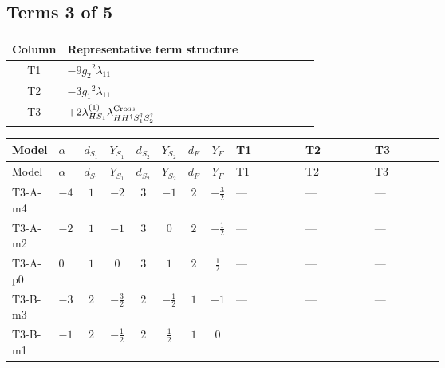 \documentclass[8pt]{article}
\begin{document}
\begin{landscape}
\subsection*{Terms 3 of 5}
\begin{center}
\begin{tabular}{@{}c >{\raggedright\arraybackslash}p{0.82\linewidth}@{}}
\toprule
Column & Representative term structure \\
\midrule
T1 & \(\displaystyle -9 {g_2}^2 {\lambda_{11}}\) \\
\midrule
T2 & \(\displaystyle -3 {g_1}^2 {\lambda_{11}}\) \\
\midrule
T3 & \(\displaystyle +2 {\lambda_{HS_1}^{(1)}} {\lambda_{H H^\dagger S_1^\dagger S_2^\dagger}^{\rm Cross}}\) \\
\midrule
\bottomrule
\end{tabular}
\end{center}
\smallskip
\tiny
\begin{longtable}{@{}llcccccc >{\raggedright\arraybackslash}p{0.21\linewidth} >{\raggedright\arraybackslash}p{0.21\linewidth} >{\raggedright\arraybackslash}p{0.21\linewidth}@{}}
\toprule
Model & $\alpha$ & $d_{S_1}$ & $Y_{S_1}$ & $d_{S_2}$ & $Y_{S_2}$ & $d_F$ & $Y_F$ & T1 & T2 & T3 \\
\midrule
\endfirsthead
\toprule
Model & $\alpha$ & $d_{S_1}$ & $Y_{S_1}$ & $d_{S_2}$ & $Y_{S_2}$ & $d_F$ & $Y_F$ & T1 & T2 & T3 \\
\midrule
\endhead
T3-A-m4 & $-4$ & $1$ & $-2$ & $3$ & $-1$ & $2$ & $-\frac{3}{2}$ & --- & --- & --- \\
\midrule
T3-A-m2 & $-2$ & $1$ & $-1$ & $3$ & $0$ & $2$ & $-\frac{1}{2}$ & --- & --- & --- \\
\midrule
T3-A-p0 & $0$ & $1$ & $0$ & $3$ & $1$ & $2$ & $\frac{1}{2}$ & --- & --- & --- \\
\midrule
T3-B-m3 & $-3$ & $2$ & $-\frac{3}{2}$ & $2$ & $-\frac{1}{2}$ & $1$ & $-1$ & --- & --- & --- \\
\midrule
T3-B-m1 & $-1$ & $2$ & $-\frac{1}{2}$ & $2$ & $\frac{1}{2}$ & $1$ & $0$ & \scriptsize\adjustbox{max width=\linewidth}{$\begin{gathered} -9 {g_2}^2 {\lambda_{11}}\end{gathered}$} & \scriptsize\adjustbox{max width=\linewidth}{$\begin{gathered} -3 {g_1}^2 {\lambda_{11}}\end{gathered}$} & \scriptsize\adjustbox{max width=\linewidth}{$\begin{gathered} +2 {\lambda_{HS_1}^{(1)}} {\lambda_{H H^\dagger S_1^\dagger S_2^\dagger}^{\rm Cross}}\end{gathered}$} \\

\end{longtable}
\end{landscape}
\end{document}
